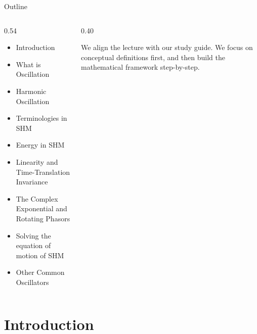 \documentclass[aspectratio=169,xcolor=dvipsnames]{beamer}
\begin{document}
\begin{frame}{Outline}
  \begin{columns}[T]
    \begin{column}{0.54\textwidth}
      \large
      \begin{itemize}
        \item[\color{lawcolor}\checkmark] Introduction
        \item[\color{lawcolor}\checkmark] What is Oscillation
        \item[\color{lawcolor}\checkmark] Harmonic Oscillation
        \item[\color{lawcolor}\checkmark] Terminologies in SHM
        \item[\color{lawcolor}\checkmark] Energy in SHM
        \item[\color{lawcolor}\checkmark] Linearity and Time-Translation Invariance
        \item[\color{lawcolor}\checkmark] The Complex Exponential and Rotating Phasors
        \item[\color{lawcolor}\checkmark] Solving the equation of motion of SHM
        \item[\color{lawcolor}\checkmark] Other Common Oscillators
      \end{itemize}
    \end{column}
    \begin{column}{0.40\textwidth}
      \begin{umnote}
        We align the lecture with our study guide. We focus on conceptual definitions first, and then build the mathematical framework step-by-step.
      \end{umnote}
    \end{column}
  \end{columns}
\end{frame}

\section{Introduction}
\end{document}

